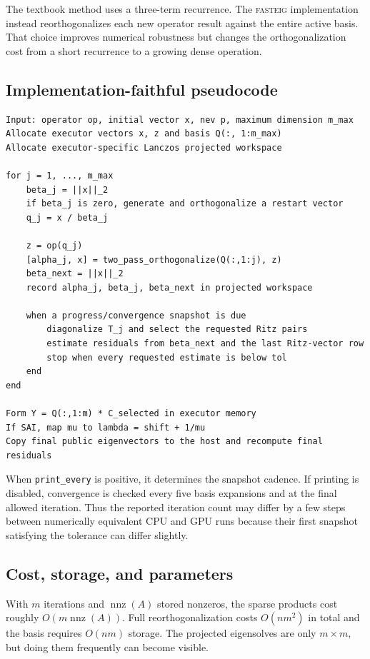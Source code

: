 \documentclass[11pt]{article}
\newcommand{\fasteig}{\textsc{fasteig}}
\newcommand{\code}[1]{\texttt{#1}}
\begin{document}
The textbook method uses a three-term recurrence.  The \fasteig{}
implementation instead reorthogonalizes each new operator result against the
entire active basis.  That choice improves numerical robustness but changes the
orthogonalization cost from a short recurrence to a growing dense operation.

\subsection{Implementation-faithful pseudocode}

\begin{lstlisting}
Input: operator op, initial vector x, nev p, maximum dimension m_max
Allocate executor vectors x, z and basis Q(:, 1:m_max)
Allocate executor-specific Lanczos projected workspace

for j = 1, ..., m_max
    beta_j = ||x||_2
    if beta_j is zero, generate and orthogonalize a restart vector
    q_j = x / beta_j

    z = op(q_j)
    [alpha_j, x] = two_pass_orthogonalize(Q(:,1:j), z)
    beta_next = ||x||_2
    record alpha_j, beta_j, beta_next in projected workspace

    when a progress/convergence snapshot is due
        diagonalize T_j and select the requested Ritz pairs
        estimate residuals from beta_next and the last Ritz-vector row
        stop when every requested estimate is below tol
    end
end

Form Y = Q(:,1:m) * C_selected in executor memory
If SAI, map mu to lambda = shift + 1/mu
Copy final public eigenvectors to the host and recompute final residuals
\end{lstlisting}

When \code{print\_every} is positive, it determines the snapshot cadence.  If
printing is disabled, convergence is checked every five basis expansions and at
the final allowed iteration.  Thus the reported iteration count may differ by a
few steps between numerically equivalent CPU and GPU runs because their first
snapshot satisfying the tolerance can differ slightly.

\subsection{Cost, storage, and parameters}

With $m$ iterations and $\operatorname{nnz}(A)$ stored nonzeros, the sparse
products cost roughly $O(m\operatorname{nnz}(A))$.  Full reorthogonalization
costs $O(nm^2)$ in total and the basis requires $O(nm)$ storage.  The projected
eigensolves are only $m\times m$, but doing them frequently can become visible.
\end{document}
